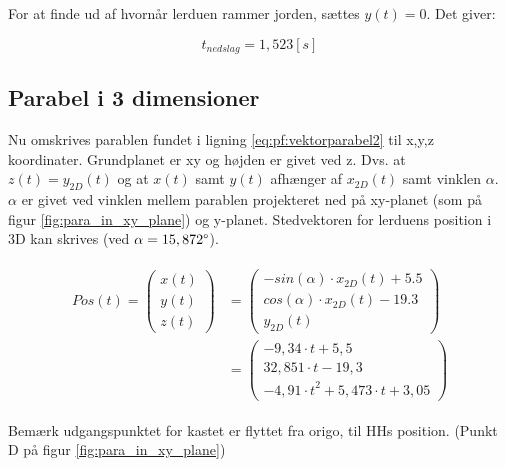 For at finde ud af hvornår lerduen rammer jorden, sættes \(y(t) = 0\). Det giver:

\begin{equation}
t_{nedslag} = 1,523 [s]
\label{eq:pf:nedslagstid}
\end{equation}

\subsection{Parabel i 3 dimensioner}
\label{subsubsec:para}
Nu omskrives parablen fundet i ligning \ref{eq:pf:vektorparabel2} til x,y,z koordinater. 
Grundplanet er xy og højden er givet ved z. Dvs. at \(z(t) = y_{2D}(t)\) og at \(x(t)\) samt \(y(t)\) afhænger af \(x_{2D}(t)\) samt vinklen \(\alpha\). 
\(\alpha\) er givet ved vinklen mellem parablen projekteret ned på xy-planet (som på figur \ref{fig:para_in_xy_plane}) og y-planet.
Stedvektoren for lerduens position i 3D kan skrives (ved \(\alpha = 15,872 \degree\)). 

\begin{align}
\begin{split}
Pos\left( t \right) = 
\left( \begin{matrix} x\left( t \right)  \\
 y\left( t \right)  \\ 
 z\left( t \right)  \end{matrix} \right) &=
 \left( \begin{matrix} - sin\left( \alpha  \right) \cdot { x }_{ 2D }\left( t \right) + 5.5 \\
 cos\left( \alpha  \right) \cdot { x }_{ 2D }\left( t \right) - 19.3  \\
  { y }_{ 2D }\left( t \right)  \end{matrix} \right)
\\
&= \left( \begin{matrix} - 9,34\cdot t+5,5 \\
  32,851\cdot t-19,3 \\ 
 -{ 4,91\cdot t }^{ 2 }+5,473\cdot t+3,05\end{matrix} \right) 
\label{eq:pf:vektorparabel3d}
\end{split}
\end{align}





Bemærk udgangspunktet for kastet er flyttet fra origo, til HHs position. (Punkt D på figur \ref{fig:para_in_xy_plane})

